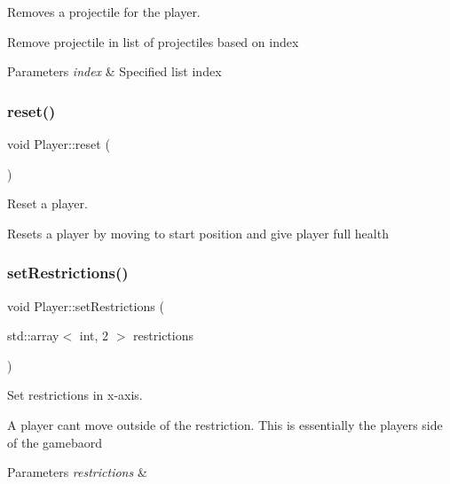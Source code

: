 Removes a projectile for the player. 

Remove projectile in list of projectiles based on index 
\begin{DoxyParams}{Parameters}
{\em index} & Specified list index \\
\hline
\end{DoxyParams}
\mbox{\label{classPlayer_a1af5d39f7bac2aeaa1e30c7dda2332fa}} 
\subsubsection{\texorpdfstring{reset()}{reset()}}
{\footnotesize\ttfamily void Player\+::reset (\begin{DoxyParamCaption}{ }\end{DoxyParamCaption})}



Reset a player. 

Resets a player by moving to start position and give player full health \mbox{\label{classPlayer_acadddee1df9fd4fcf1a1bcca7f8b0149}} 
\subsubsection{\texorpdfstring{set\+Restrictions()}{setRestrictions()}\hspace{0.1cm}{\footnotesize\ttfamily [1/2]}}
{\footnotesize\ttfamily void Player\+::set\+Restrictions (\begin{DoxyParamCaption}\item[{std\+::array$<$ int, 2 $>$}]{restrictions }\end{DoxyParamCaption})}



Set restrictions in x-\/axis. 

A player can\textquotesingle{}t move outside of the restriction. This is essentially the player\textquotesingle{}s side of the gamebaord 
\begin{DoxyParams}{Parameters}
{\em restrictions} & \\
\hline
\end{DoxyParams}
\mbox{\label{classPlayer_ad3a9bf907eed07ee7ec3e2caddbb7c01}} 
